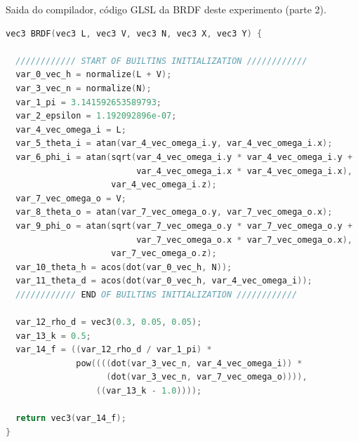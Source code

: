 \begin{codigo}[H]
    \caption{\small Saida do compilador, código GLSL da BRDF deste experimento  (parte 2). }
    \label{cod-minnaert-glsl-pt-2}
\begin{lstlisting}[language=C, inputencoding=utf8]
vec3 BRDF(vec3 L, vec3 V, vec3 N, vec3 X, vec3 Y) {

  //////////// START OF BUILTINS INITIALIZATION ////////////
  var_0_vec_h = normalize(L + V);
  var_3_vec_n = normalize(N);
  var_1_pi = 3.141592653589793;
  var_2_epsilon = 1.192092896e-07;
  var_4_vec_omega_i = L;
  var_5_theta_i = atan(var_4_vec_omega_i.y, var_4_vec_omega_i.x);
  var_6_phi_i = atan(sqrt(var_4_vec_omega_i.y * var_4_vec_omega_i.y +
                          var_4_vec_omega_i.x * var_4_vec_omega_i.x),
                     var_4_vec_omega_i.z);
  var_7_vec_omega_o = V;
  var_8_theta_o = atan(var_7_vec_omega_o.y, var_7_vec_omega_o.x);
  var_9_phi_o = atan(sqrt(var_7_vec_omega_o.y * var_7_vec_omega_o.y +
                          var_7_vec_omega_o.x * var_7_vec_omega_o.x),
                     var_7_vec_omega_o.z);
  var_10_theta_h = acos(dot(var_0_vec_h, N));
  var_11_theta_d = acos(dot(var_0_vec_h, var_4_vec_omega_i));
  //////////// END OF BUILTINS INITIALIZATION ////////////

  var_12_rho_d = vec3(0.3, 0.05, 0.05);
  var_13_k = 0.5;
  var_14_f = ((var_12_rho_d / var_1_pi) *
              pow((((dot(var_3_vec_n, var_4_vec_omega_i)) *
                    (dot(var_3_vec_n, var_7_vec_omega_o)))),
                  ((var_13_k - 1.0))));

  return vec3(var_14_f);
}
\end{lstlisting}
\end{codigo}

